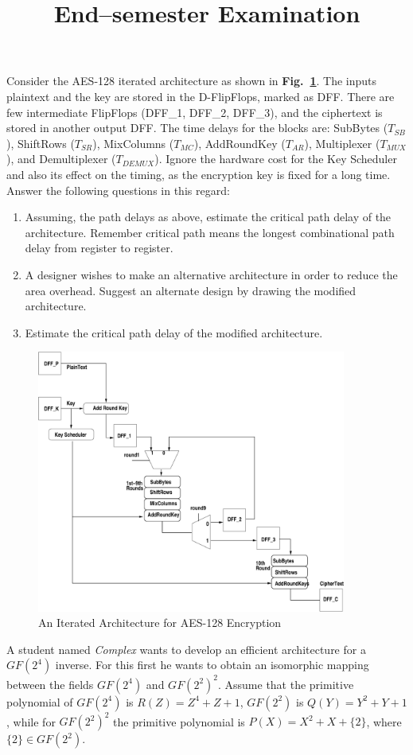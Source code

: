 \documentclass{article}
\title{End--semester Examination}
\begin{document}
\begin{questions}
\question Consider the AES-128 iterated architecture as shown in 
{\bf Fig.~\ref{loopAES1}}. The inputs plaintext and the key are stored 
in the D-FlipFlops, marked as DFF. There are few intermediate 
FlipFlops (DFF\_1, DFF\_2, DFF\_3), 
and the ciphertext is stored in another output DFF. The time delays 
for the blocks are: SubBytes ($T_{SB}$), ShiftRows ($T_{SR}$), 
MixColumns ($T_{MC}$), AddRoundKey ($T_{AR}$), Multiplexer ($T_{MUX}$), 
and Demultiplexer ($T_{DEMUX}$). Ignore the hardware cost for the 
Key Scheduler and also its effect on the timing, as the encryption key is 
fixed for a long time. Answer the following questions in this regard:
\begin{enumerate}
\item Assuming, the path delays as above, estimate the critical 
path delay of the architecture. Remember critical path means the longest combinational path delay 
from register to register. 
\item A designer wishes to make an alternative architecture in order to reduce 
the area overhead. Suggest an alternate design by drawing the modified architecture. 
\item Estimate the critical path delay of the modified architecture.  
\end{enumerate} 


\begin{figure}[h]
\centering
\includegraphics[width=4in]{loopAES}
\caption{An Iterated Architecture for AES-128 Encryption}
\label{loopAES1}
\end{figure}


\question A student named {\em Complex} wants to develop an efficient architecture for a 
$GF(2^4)$ inverse. For this first he wants to obtain an isomorphic mapping 
between the fields $GF(2^4)$ and $GF(2^2)^2$. Assume 
that the primitive polynomial of $GF(2^4)$ is $R(Z)=Z^4+Z+1$, 
$GF(2^2)$ is $Q(Y)=Y^2+Y+1$, while for $GF(2^2)^2$ the 
primitive polynomial is $P(X)=X^2+X+\{2\}$, where 
$\{2\}\in GF(2^2)$. 


\end{questions}
\end{document}
